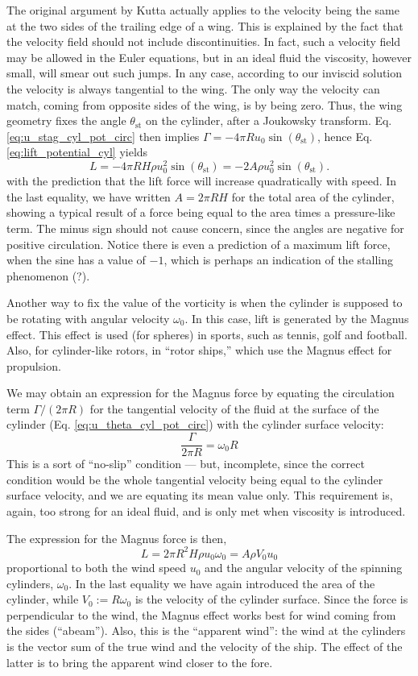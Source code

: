The original argument by Kutta actually applies to the velocity being the
same at the two sides of the trailing edge of a wing. This is explained by
the fact that the velocity field should not include discontinuities. In
fact, such a velocity field may be allowed in the Euler equations, but in
an ideal fluid the viscosity, however small, will smear out such jumps. 
In any case, according to our inviscid
solution the velocity is always tangential to the wing. The only
way the velocity can match, coming from opposite sides of the wing, is by
being zero. Thus, the wing geometry fixes the angle $\theta_\text{st}$  on
the cylinder, after a Joukowsky transform. Eq. \eqref{eq:u_stag_cyl_pot_circ}
then implies $\Gamma = - 4\pi R u_0 \sin(\theta_\text{st})$, hence
Eq. \eqref{eq:lift_potential_cyl} yields
\[
L = -4\pi R H  \rho u_0^2 \sin(\theta_\text{st}) =
- 2 A  \rho u_0^2 \sin(\theta_\text{st}) .
\]
with the prediction that the lift force will increase quadratically with speed. In the last equality, we have written $A=2\pi R H$ for the total area of the cylinder, showing a typical result
of a force being equal to the area times a pressure-like
term. The minus sign should not cause concern, since the angles are negative for positive circulation. Notice there is even a prediction of a maximum lift force,
when the sine has a value of $-1$, which is perhaps an indication of the
stalling phenomenon (?).

Another way to fix the value of the vorticity is when the cylinder is supposed
to be rotating with angular velocity $\omega_0$. In this case, lift is generated
by the Magnus effect. This effect is used (for spheres) in sports, such as tennis, golf and
football. Also, for cylinder-like rotors, in ``rotor ships,'' which use
the Magnus effect for propulsion.

We may obtain an expression for the Magnus force by equating the
circulation term $\Gamma/(2\pi R)$ for the tangential velocity
of the fluid at the surface of the cylinder
(Eq. \ref{eq:u_theta_cyl_pot_circ}) with the cylinder surface
velocity:
\[
\frac{\Gamma}{2\pi R} = \omega_0 R 
\]
This is a sort of ``no-slip'' condition --- but, incomplete,
since the correct condition would be the whole tangential velocity
being equal to the cylinder surface velocity, and we are equating
its mean value only. This requirement is, again, too strong for an ideal fluid,
and is only met when viscosity is introduced.

The expression for the Magnus force is then,
\[
L = 2 \pi R^2 H \rho u_0 \omega_0  =
A \rho V_0   u_0
\]
proportional to both the wind speed $u_0$ and the angular
velocity of the spinning cylinders, $\omega_0$.
In the last equality we have again introduced the area
of the cylinder, while $V_0 := R \omega_0$ is the velocity
of the cylinder surface.
Since the force is perpendicular
to the wind, the Magnus effect works best for wind coming
from the sides (``abeam''). Also, this is the ``apparent wind'':
the wind at the cylinders is the vector sum of the true
wind and the velocity of the ship. The effect of the latter
is to bring the apparent wind closer to the fore.

